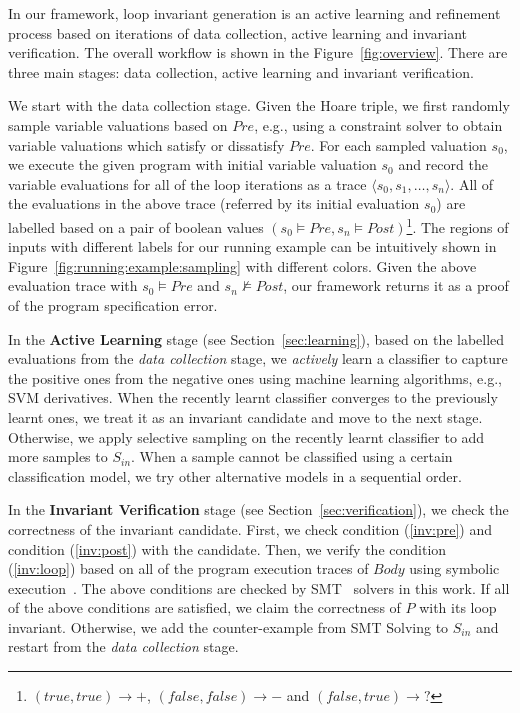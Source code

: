 In our framework, loop invariant generation is an active learning and refinement process based on iterations of data collection, active learning and invariant verification. The overall workflow is shown in the Figure~\ref{fig:overview}. There are three main stages: data collection, active learning and invariant verification.

We start with the data collection stage. Given the Hoare triple, we first randomly sample variable valuations based on $\mathit{Pre}$, e.g., using a constraint solver to obtain variable valuations which satisfy or dissatisfy $\mathit{Pre}$. For each sampled valuation $s_0$, we execute the given program with initial variable valuation $s_0$ and record the variable evaluations for all of the loop iterations as a trace $\langle s_0, s_1, \ldots, s_n \rangle$.
    All of the evaluations in the above trace (referred by its initial evaluation $s_0$)
    are labelled based on a pair of boolean values
    $(s_0 \models \mathit{Pre}, s_n \models \mathit{Post})$\footnote{
        $(\mathit{true}, \mathit{true}) \rightarrow +$,
        $(\mathit{false}, \mathit{false}) \rightarrow -$
        and $(\mathit{false}, \mathit{true}) \rightarrow ?$}.
    The regions of inputs with different labels for our running example can be intuitively shown
    in Figure~\ref{fig:running:example:sampling} with different colors.
    Given the above evaluation trace with
    $s_0 \models \mathit{Pre}$ and $s_n \not\models \mathit{Post}$,
    our framework returns it as a proof of the program specification error.

    In the \textbf{Active Learning} stage (see Section~\ref{sec:learning}),
    based on the labelled evaluations from the \emph{data collection} stage,
    we \emph{actively} learn a classifier to capture the positive ones from the negative ones
    using machine learning algorithms, e.g., SVM derivatives.
    When the recently learnt classifier converges to the previously learnt ones,
    we treat it as an invariant candidate and move to the next stage.
    Otherwise, we apply selective sampling on the recently learnt classifier
    to add more samples to $S_{\mathit{in}}$.
    When a sample cannot be classified using a certain classification model,
    we try other alternative models in a sequential order.

    In the \textbf{Invariant Verification} stage (see Section~\ref{sec:verification}),
    we check the correctness of the invariant candidate.
    First, we check condition (\ref{inv:pre}) and condition (\ref{inv:post}) with the candidate.
    Then, we verify the condition (\ref{inv:loop})
    based on all of the program execution traces of $\mathit{Body}$ using symbolic execution~\cite{}.
    The above conditions are checked by SMT~\cite{barrett2009satisfiability} solvers in this work.
    If all of the above conditions are satisfied,
    we claim the correctness of $P$ with its loop invariant.
    Otherwise, we add the counter-example from SMT Solving to $S_{\mathit{in}}$
    and restart from the \emph{data collection} stage.

